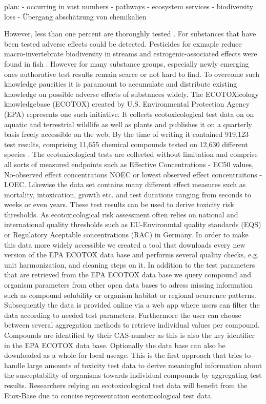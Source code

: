 \documentclass[english]{article}
\newcommand{\etoxbase}{Etox-Base}
\newcommand{\epa}{EPA ECOTOX data base}
\begin{document}
plan:
- occurring in vast numbers
- pathways
- ecosystem services 
- biodiversity loss
- Übergang abschätzung von chemikalien


However, less than one percent are thoroughly tested \citep{breithaupt_costs_2006}. For substances that have been tested adverse effects could be detected. Pesticides for exmaple reduce macro-invertebrate biodiversity in streams \citep{beketov_pesticides_2013} and estrogenic-associated effects were found in fish \citep{vethaak_integrated_2005}. However for many substance groups, especially newly emerging ones authorative test results remain scarce or not hard to find. To overcome such knowledge paucities it is paramount to accumulate and distribute existing knowledge on possible adverse effects of substances widely. The ECOTOXicology knowledgebase (ECOTOX) created by U.S. Environmental Protection Agency (EPA) represents one such initiative. It collects ecotoxicological test data on on aquatic and terrestrial wildlife as well as plants and publishes it on a quarterly basis freely accessible on the web. By the time of writing it contained 919,123 test results, comprising 11,655 chemical compounds tested on 12,630 different species \citep{elonen_ecotoxicology_2018}. The ecotoxicological tests are collected without limitation and comprise all sorts of measured endpoints such as Effective Concentrations - EC50 values, No-observed effect concentratons NOEC or lowest observed effect concentraitons - LOEC. Likewise the data set contains many different effect measures such as mortality, intoxication, growth etc. and test durations ranging from seconds to weeks or even years. These test results can be used to derive toxicity risk thresholds. As ecotoxicological risk assessment often relies on national and international quality thresholds such as EU-Environmtal quality standards (EQS) or Regulatory Aceptable concentrations (RAC) in Germany. In order to make this data more widely accessible we created a tool that downloads every new version of the \epa{} and performs several quality checks, e.g. unit harmonization, and cleaning steps on it. In addition to the test parameters that are retrieved from the \epa{} we query compound and organism parameters from other open data bases to adress missing information such as compound solubility or organism habitat or regional ocurrence patterns. Subsequently the data is provided online via a web app where users can filter the data according to needed test parameters. Furthermore the user can choose between several aggregation methods to retrieve individual values per compound. Compounds are identified by their CAS-number as this is also the key identifier in the \epa{}. Optionally the data base can also be downloaded as a whole for local useage. This is the first approach that tries to handle large amounts of toxicity test data to derive meaningful information about the susceptability of organisms towards individual compounds by aggregating test results. Researchers relying on ecotoxicological test data will benefit from the \etoxbase{} due to concise representation ecotoxicological test data.
\end{document}
